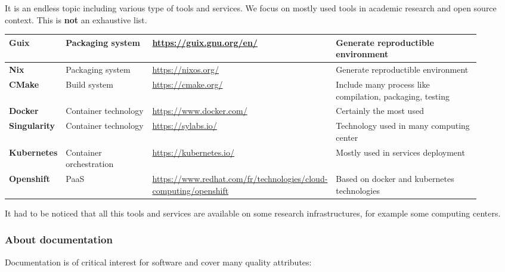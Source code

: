 It is an endless topic including various type of tools and
services. We focus on mostly used tools in academic research and open
source context. This is {\bf not} an exhaustive list.

\begin{center}
    \tabletail{\hline}
    \label{tab:tools_pack}
    \small
    \begin{supertabular}{|p{0.12\linewidth}|p{0.2\linewidth}|p{0.25\linewidth}|p{0.35\linewidth}|} \hline
    \textbf{Guix} & Packaging system & \url{https://guix.gnu.org/en/}
    & Generate reproductible environment \\ \hline
    \textbf{Nix} & Packaging system & \url{https://nixos.org/}
    & Generate reproductible environment \\ \hline
    \textbf{CMake} & Build system & \url{https://cmake.org/}
    & Include many process like compilation, packaging, testing  \\ \hline


    \textbf{Docker} & Container technology & \url{https://www.docker.com/}
    &  Certainly the most used \\ \hline
    \textbf{Singularity} & Container technology & \url{https://sylabs.io/}
    & Technology used in many computing center  \\ \hline
    \textbf{Kubernetes} & Container orchestration & \url{https://kubernetes.io/}
    & Mostly used in services deployment  \\ \hline
    \textbf{Openshift} & PaaS & \url{https://www.redhat.com/fr/technologies/cloud-computing/openshift}
    & Based on docker and kubernetes technologies  \\ \hline


\end{supertabular}
\end{center}

It had to be noticed that all this tools and services are available on
some research infrastructures, for example some computing centers.

\subsubsection{About documentation}

Documentation is of critical interest for software and cover many
quality attributes: 

